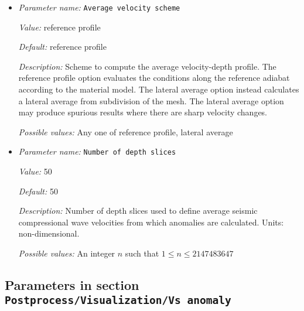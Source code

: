 \begin{itemize}
\item {\it Parameter name:} {\tt Average velocity scheme}
\label{parameters:Postprocess/Visualization/Vp anomaly/Average velocity scheme}


{\it Value:} reference profile


{\it Default:} reference profile


{\it Description:} Scheme to compute the average velocity-depth profile. The reference profile option evaluates the conditions along the reference adiabat according to the material model. The lateral average option instead calculates a lateral average from subdivision of the mesh. The lateral average option may produce spurious results where there are sharp velocity changes.


{\it Possible values:} Any one of reference profile, lateral average
\item {\it Parameter name:} {\tt Number of depth slices}
\label{parameters:Postprocess/Visualization/Vp anomaly/Number of depth slices}


{\it Value:} 50


{\it Default:} 50


{\it Description:} Number of depth slices used to define average seismic compressional wave velocities from which anomalies are calculated. Units: non-dimensional.


{\it Possible values:} An integer $n$ such that $1\leq n \leq 2147483647$
\end{itemize}

\subsection{Parameters in section \tt Postprocess/Visualization/Vs anomaly}
\label{parameters:Postprocess/Visualization/Vs_20anomaly}

